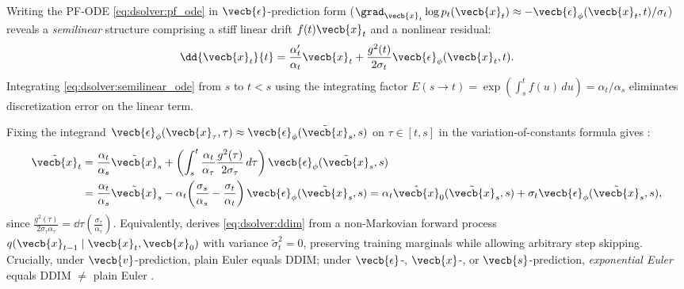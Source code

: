 \documentclass[../../../../master.tex]{subfiles}
\begin{document}
Writing the PF-ODE \eqref{eq:dsolver:pf_ode} in $\vecb{\epsilon}$-prediction form ($\grad_{\vecb{x}_t}\log p_t(\vecb{x}_t) \approx -\vecb{\epsilon}_\phi(\vecb{x}_t, t)/\sigma_t$) reveals a \emph{semilinear} structure comprising a stiff linear drift $f(t)\vecb{x}_t$ and a nonlinear residual:
\begin{equation}
  \label{eq:dsolver:semilinear_ode}
  \dd{\vecb{x}_t}{t} = \frac{\alpha'_t}{\alpha_t}\vecb{x}_t + \frac{g^2(t)}{2\sigma_t}\vecb{\epsilon}_\phi(\vecb{x}_t, t).
\end{equation}
Integrating \eqref{eq:dsolver:semilinear_ode} from $s$ to $t < s$ using the integrating factor $E(s \to t) = \exp\!\left(\int_s^t f(u)\,du\right) = \alpha_t/\alpha_s$ eliminates discretization error on the linear term.

\begin{coremath}[DDIM = Exponential Euler (Proposition 9.2.1)]
Fixing the integrand $\vecb{\epsilon}_\phi(\vecb{x}_\tau, \tau) \approx \vecb{\epsilon}_\phi(\tilde{\vecb{x}}_s, s)$ on $\tau \in [t, s]$ in the variation-of-constants formula gives :
\begin{align}
  \tilde{\vecb{x}}_t
  &= \frac{\alpha_t}{\alpha_s}\tilde{\vecb{x}}_s + \left(\int_s^t \frac{\alpha_t}{\alpha_\tau} \frac{g^2(\tau)}{2\sigma_\tau}\,d\tau\right)\vecb{\epsilon}_\phi(\tilde{\vecb{x}}_s, s) \nonumber \\
  &= \frac{\alpha_t}{\alpha_s}\tilde{\vecb{x}}_s - \alpha_t\!\left(\frac{\sigma_s}{\alpha_s} - \frac{\sigma_t}{\alpha_t}\right)\vecb{\epsilon}_\phi(\tilde{\vecb{x}}_s, s)
  = \alpha_t \hat{\vecb{x}}_0(\tilde{\vecb{x}}_s, s) + \sigma_t \vecb{\epsilon}_\phi(\tilde{\vecb{x}}_s, s), \label{eq:dsolver:ddim}
\end{align}
since $\frac{g^2(\tau)}{2\sigma_\tau \alpha_\tau} = \dd{}{\tau}\!\left(\frac{\sigma_\tau}{\alpha_\tau}\right)$. Equivalently,  derives \eqref{eq:dsolver:ddim} from a non-Markovian forward process $q(\vecb{x}_{t-1}\mid\vecb{x}_t, \vecb{x}_0)$ with variance $\tilde{\sigma}_t^2 = 0$, preserving training marginals while allowing arbitrary step skipping. Crucially, under $\vecb{v}$-prediction, plain Euler equals DDIM; under $\vecb{\epsilon}$-, $\vecb{x}$-, or $\vecb{s}$-prediction, \emph{exponential Euler} equals DDIM $\ne$ plain Euler .
\end{coremath}
\end{document}
